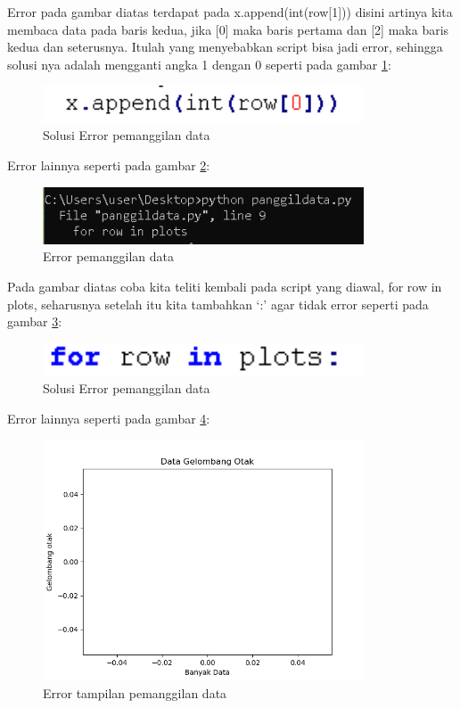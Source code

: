 Error pada gambar diatas terdapat pada x.append(int(row[1])) disini artinya kita membaca data pada baris kedua, jika [0] maka baris pertama dan [2] maka baris kedua dan seterusnya. Itulah yang menyebabkan script bisa jadi error, sehingga solusi nya adalah mengganti angka 1 dengan 0 seperti pada gambar \ref{fig:solepd}:
\begin{figure}[!htbp]
	\centerline{\includegraphics[width=0.85\textwidth]{figures/6/solepd.PNG}}
	\caption{Solusi Error pemanggilan data}
	\label{fig:solepd}
\end{figure} 

Error lainnya seperti pada gambar \ref{fig:epd}:
\begin{figure}[!htbp]
	\centerline{\includegraphics[width=0.85\textwidth]{figures/6/epd.PNG}}
	\caption{Error pemanggilan data}
	\label{fig:epd}
\end{figure} 

Pada gambar diatas coba kita teliti kembali pada script yang diawal,  for row in plots, seharusnya setelah itu kita tambahkan ‘:’ agar tidak error seperti pada gambar \ref{fig:sepd}:
\begin{figure}[!htbp]
	\centerline{\includegraphics[width=0.85\textwidth]{figures/6/sepd.PNG}}
	\caption{Solusi Error pemanggilan data}
	\label{fig:sepd}
\end{figure} 
  
Error lainnya seperti pada gambar \ref{fig:etpd}:
\begin{figure}[!htbp]
	\centerline{\includegraphics[width=0.85\textwidth]{figures/6/etpd.PNG}}
	\caption{Error tampilan  pemanggilan data}
	\label{fig:etpd}
\end{figure} 

